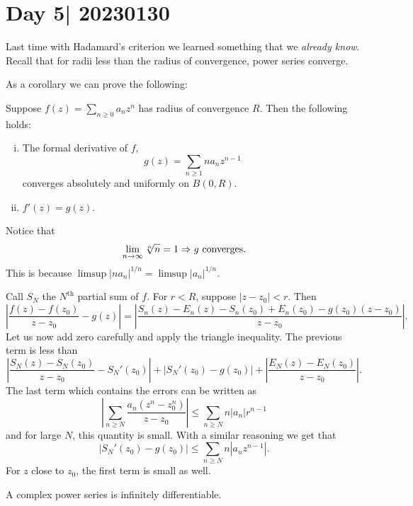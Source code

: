 \documentclass[12pt]{memoir}
\begin{document}
\begin{ptcbp}
    
\end{ptcbp}

\section{Day 5| 20230130}

Last time with Hadamard's criterion we learned something that we \emph{already know}. Recall that for radii less than the radius of convergence, power series converge.\par 
As a corollary we can prove the following:

\begin{Cor}
    Suppose $f(z)=\sum_{n\geq 0}a_nz^n$ has radius of convergence $R$. Then the following holds:
    \begin{enumerate}[i)]
        \itemsep=-0.4em
        \item The formal derivative of $f$, 
        $$g(z)=\sum_{n\geq 1}na_nz^{n-1}$$
        converges absolutely and uniformly on $B(0,R)$.
        \item $f'(z)=g(z)$.
    \end{enumerate}
\end{Cor}

\begin{ptcbp}
Notice that 
$$\lim_{n\to\infty}\sqrt[n]{n}=1\To g\ \text{converges}.$$
This is because $\limsup|na_n|^{1/n}=\limsup|a_n|^{1/n}$.\par 
Call $S_N$ the $N^{\text{th}}$ partial sum of $f$. For $r<R$, suppose $|z-z_0|<r$. Then 
$$\left|\frac{f(z)-f(z_0)}{z-z_0}-g(z)\right|=\left|\frac{S_n(z)-E_n(z)-S_n(z_0)+E_n(z_0)-g(z_0)(z-z_0)}{z-z_0}\right|.$$
Let us now add zero carefully and apply the triangle inequality. The previous term is less than 
$$\left|\frac{S_N(z)-S_N(z_0)}{z-z_0}-S_N'(z_0)\right|+|S_N'(z_0)-g(z_0)|+\left|\frac{E_N(z)-E_N(z_0)}{z-z_0}\right|.$$
The last term which contains the errors can be written as 
$$\left|\sum_{n\geq N}\frac{a_n(z^n-z_0^n)}{z-z_0}\right|\leq \sum_{n\geq N}n|a_n|r^{n-1}$$
and for large $N$, this quantity is small. With a similar reasoning we get that 
$$|S_N'(z_0)-g(z_0)|\leq \sum_{n\geq N}n|a_nz^{n-1}|.$$
For $z$ close to $z_0$, the first term is small as well.
\end{ptcbp}

\begin{Cor}
    A complex power series is infinitely differentiable. 
\end{Cor}
\end{document}
